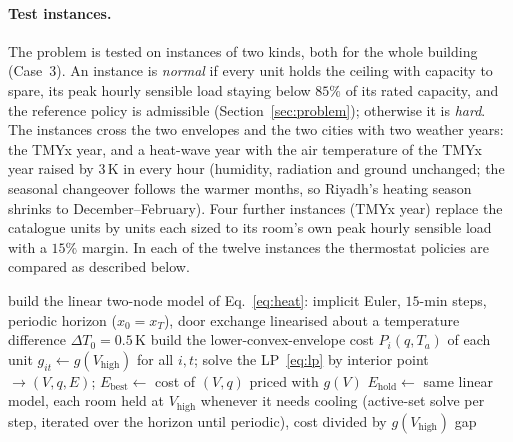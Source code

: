\documentclass[10pt,a4paper,twocolumn]{article}
\theoremstyle{definition}
\begin{document}
\paragraph{Test instances.}\label{sec:instances} The problem is tested on instances of two kinds, both for the whole building (Case~3). An instance is \emph{normal} if every unit holds the ceiling with capacity to spare, its peak hourly sensible load staying below $85\%$ of its rated capacity, and the reference policy is admissible (Section~\ref{sec:problem}); otherwise it is \emph{hard}. The instances cross the two envelopes and the two cities with two weather years: the TMYx year, and a heat-wave year with the air temperature of the TMYx year raised by $3\,$K in every hour (humidity, radiation and ground unchanged; the seasonal changeover follows the warmer months, so Riyadh's heating season shrinks to December--February). Four further instances (TMYx year) replace the catalogue units by units each sized to its room's own peak hourly sensible load with a $15\%$ margin. In each of the twelve instances the thermostat policies are compared as described below.

\begin{algorithm}[t]
\caption{\textsc{PerfectForesightBenchmark}$(\text{case},H,v_{\min},\gamma)$}\label{alg:pfb}
build the linear two-node model of Eq.~\eqref{eq:heat}: implicit Euler, $15$-min steps, periodic horizon ($x_0=x_T$), door exchange linearised about a temperature difference $\Delta T_0=0.5\,$K\;
build the lower-convex-envelope cost $P_i(q,T_a)$ of each unit\;
$g_{it}\leftarrow g(V_{\text{high}})$ for all $i,t$; solve the LP~\eqref{eq:lp} by interior point $\to(V,q,E)$; $E_{\text{best}}\leftarrow$ cost of $(V,q)$ priced with $g(V)$\;
$E_{\text{hold}}\leftarrow$ same linear model, each room held at $V_{\text{high}}$ whenever it needs cooling (active-set solve per step, iterated over the horizon until periodic), cost divided by $g(V_{\text{high}})$\;
\Return gap\;
\end{algorithm}
\end{document}
